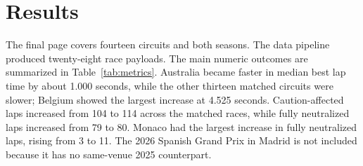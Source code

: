 \documentclass[conference]{IEEEtran}
\begin{document}
\section{Results}
The final page covers fourteen circuits and both seasons. The data pipeline produced twenty-eight race payloads. The main numeric outcomes are summarized in Table~\ref{tab:metrics}. Australia became faster in median best lap time by about 1.000 seconds, while the other thirteen matched circuits were slower; Belgium showed the largest increase at 4.525 seconds. Caution-affected laps increased from 104 to 114 across the matched races, while fully neutralized laps increased from 79 to 80. Monaco had the largest increase in fully neutralized laps, rising from 3 to 11. The 2026 Spanish Grand Prix in Madrid is not included because it has no same-venue 2025 counterpart.
\end{document}
